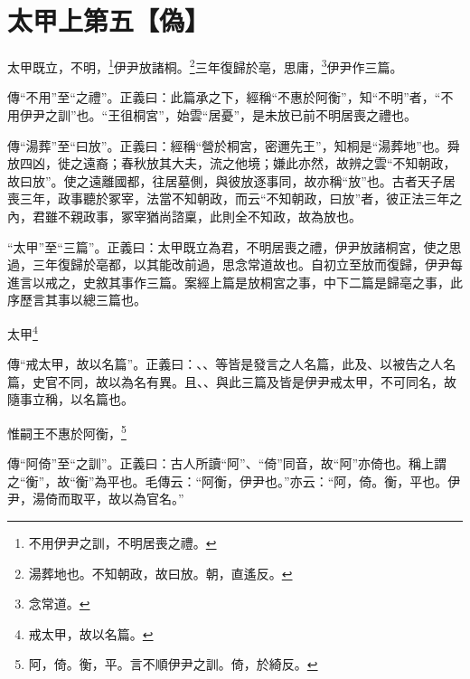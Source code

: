 \section{太甲上第五【偽】}


太甲既立，不明，\footnote{不用伊尹之訓，不明居喪之禮。}伊尹放諸桐。\footnote{湯葬地也。不知朝政，故曰放。朝，直遙反。}三年復歸於亳，思庸，\footnote{念常道。}伊尹作三篇。


{\noindent\zhuan{}\fzbyks 傳“不用”至“之禮”。正義曰：此篇承之下，經稱“不惠於阿衡”，知“不明”者，“不用伊尹之訓”也。“王徂桐宮”，始雲“居憂”，是未放已前不明居喪之禮也。 \par}

{\noindent\zhuan{}\fzbyks 傳“湯葬”至“曰放”。正義曰：經稱“營於桐宮，密邇先王”，知桐是“湯葬地”也。舜放四凶，徙之遠裔；春秋放其大夫，流之他境；嫌此亦然，故辨之雲“不知朝政，故曰放”。使之遠離國都，往居墓側，與彼放逐事同，故亦稱“放”也。古者天子居喪三年，政事聽於冢宰，法當不知朝政，而云“不知朝政，曰放”者，彼正法三年之內，君雖不親政事，冢宰猶尚諮稟，此則全不知政，故為放也。 \par}

{\noindent\shu{}\fzkt “太甲”至“三篇”。正義曰：太甲既立為君，不明居喪之禮，伊尹放諸桐宮，使之思過，三年復歸於亳都，以其能改前過，思念常道故也。自初立至放而復歸，伊尹每進言以戒之，史敘其事作三篇。案經上篇是放桐宮之事，中下二篇是歸亳之事，此序歷言其事以總三篇也。 \par}

太甲\footnote{戒太甲，故以名篇。}

{\noindent\zhuan{}\fzbyks 傳“戒太甲，故以名篇”。正義曰：、、等皆是發言之人名篇，此及、以被告之人名篇，史官不同，故以為名有異。且、、與此三篇及皆是伊尹戒太甲，不可同名，故隨事立稱，以名篇也。 \par}

惟嗣王不惠於阿衡，\footnote{阿，倚。衡，平。言不順伊尹之訓。倚，於綺反。}


{\noindent\zhuan{}\fzbyks 傳“阿倚”至“之訓”。正義曰：古人所讀“阿”、“倚”同音，故“阿”亦倚也。稱上謂之“衡”，故“衡”為平也。毛傳云：“阿衡，伊尹也。”亦云：“阿，倚。衡，平也。伊尹，湯倚而取平，故以為官名。” \par}

